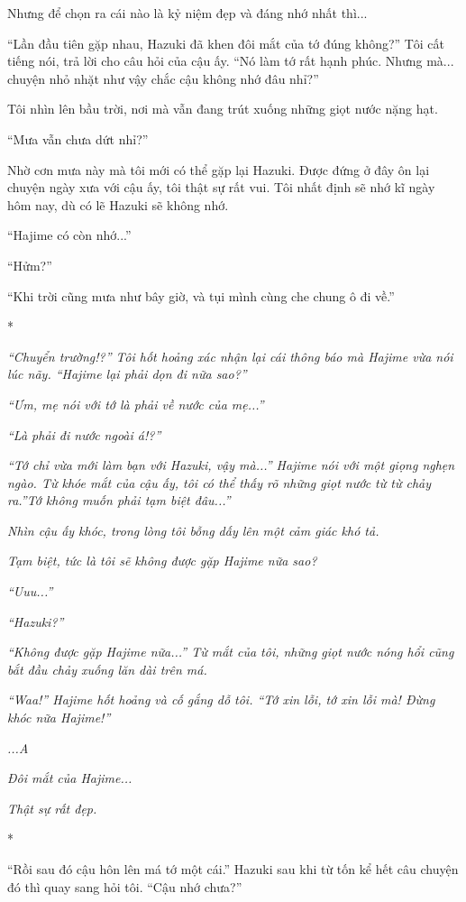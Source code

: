 {Nhưng để chọn ra cái nào là kỷ niệm đẹp và đáng nhớ nhất thì...

``Lần đầu tiên gặp nhau, Hazuki đã khen đôi mắt của tớ đúng không?'' Tôi
cất tiếng nói, trả lời cho câu hỏi của cậu ấy. ``Nó làm tớ rất hạnh
phúc. Nhưng mà... chuyện nhỏ nhặt như vậy chắc cậu không nhớ đâu nhỉ?''

Tôi nhìn lên bầu trời, nơi mà vẫn đang trút xuống những giọt nước nặng
hạt.

``Mưa vẫn chưa dứt nhỉ?''

Nhờ cơn mưa này mà tôi mới có thể gặp lại Hazuki. Được đứng ở đây ôn lại
chuyện ngày xưa với cậu ấy, tôi thật sự rất vui. Tôi nhất định sẽ nhớ kĩ
ngày hôm nay, dù có lẽ Hazuki sẽ không nhớ.

``Hajime có còn nhớ...''

``Hửm?''

``Khi trời cũng mưa như bây giờ, và tụi mình cùng che chung ô đi về.''

*

\emph{``Chuyển trường!?'' Tôi hốt hoảng xác nhận lại cái thông báo mà
Hajime vừa nói lúc nãy. ``Hajime lại phải dọn đi nữa sao?''}

\emph{``Ưm, mẹ nói với tớ là phải về nước của mẹ...''}

\emph{``Là phải đi nước ngoài á!?''}

\emph{``Tớ chỉ vừa mới làm bạn với Hazuki, vậy mà...'' Hajime nói với
một giọng nghẹn ngào. Từ khóe mắt của cậu ấy, tôi có thể thấy rõ những
giọt nước từ từ chảy ra.''Tớ không muốn phải tạm biệt đâu...''}

\emph{Nhìn cậu ấy khóc, trong lòng tôi bỗng dấy lên một cảm giác khó
tả.}

\emph{Tạm biệt, tức là tôi sẽ không được gặp Hajime nữa sao?}

\emph{``Uuu...''}

\emph{``Hazuki?''}

\emph{``Không được gặp Hajime nữa...'' Từ mắt của tôi, những giọt nước
nóng hổi cũng bắt đầu chảy xuống lăn dài trên má.}

\emph{``Waa!'' Hajime hốt hoảng và cố gắng dỗ tôi. ``Tớ xin lỗi, tớ xin
lỗi mà! Đừng khóc nữa Hajime!''}

\emph{...A}

\emph{Đôi mắt của Hajime...}

\emph{Thật sự rất đẹp.}

*

``Rồi sau đó cậu hôn lên má tớ một cái.'' Hazuki sau khi từ tốn kể hết
câu chuyện đó thì quay sang hỏi tôi. ``Cậu nhớ chưa?''

}
